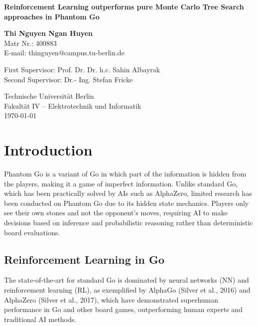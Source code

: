 \documentclass[12pt,oneside,openright]{article}
\newcommand{\topic}
{Reinforcement Learning outperforms pure Monte Carlo Tree Search approaches in Phantom Go}
\begin{document}
\date{\today}
\begin{center}
    \vspace*{1cm}
    \Huge
    \textbf{\topic}
    \LARGE

    \vspace{2cm}

    \textbf{Thi Nguyen Ngan Huyen}\\
    \vspace{0.5cm}
    \normalsize
    Matr Nr.: 400883\\
    E-mail: thinguyen@campus.tu-berlin.de
    \vspace{2cm}

    \large
    \begin{center}
        First Supervisor: Prof. Dr. Dr. h.c. Sahin Albayrak \\
        Second Supervisor: Dr.- Ing. Stefan Fricke
    \end{center}        \vspace{0.8cm}

    \Large
    Technische Universität Berlin\\
    Fakultät IV – Elektrotechnik und Informatik\\
    \vspace{1cm}
    \today
\end{center}
\newpage

\section{Introduction}

Phantom Go is a variant of Go in which part of the information is hidden from the players, making it a game of imperfect information. Unlike standard Go, which has been practically solved by AIs such as AlphaZero, limited research has been conducted on Phantom Go due to its hidden state mechanics. Players only see their own stones and not the opponent’s moves, requiring AI to make decisions based on inference and probabilistic reasoning rather than deterministic board evaluations.

\subsection{Reinforcement Learning in Go}

The state-of-the-art for standard Go is dominated by neural networks (NN) and reinforcement learning (RL), as exemplified by AlphaGo (Silver et al., 2016)\cite{Silver2016} and AlphaZero (Silver et al., 2017)\cite{Silver2017}, which have demonstrated superhuman performance in Go and other board games, outperforming human experts and traditional AI methods.
\end{document}
